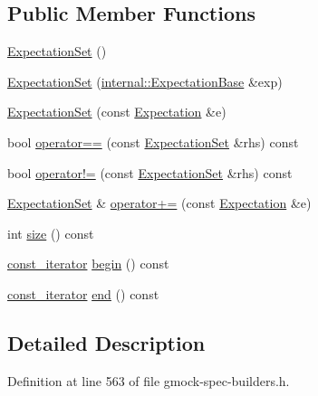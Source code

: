 \subsection*{Public Member Functions}
\begin{DoxyCompactItemize}
\item 
\hyperlink{classtesting_1_1_expectation_set_a78cda231077b84b5c94d25a845a74374}{Expectation\+Set} ()
\item 
\hyperlink{classtesting_1_1_expectation_set_a2448d9668e5b1a5372c97f59f1039db6}{Expectation\+Set} (\hyperlink{classtesting_1_1internal_1_1_expectation_base}{internal\+::\+Expectation\+Base} \&exp)
\item 
\hyperlink{classtesting_1_1_expectation_set_a2ab7f20951509d1358782093f3b7a25b}{Expectation\+Set} (const \hyperlink{classtesting_1_1_expectation}{Expectation} \&e)
\item 
bool \hyperlink{classtesting_1_1_expectation_set_a84f7bc8d35dc47d42d26fafca1086cfd}{operator==} (const \hyperlink{classtesting_1_1_expectation_set}{Expectation\+Set} \&rhs) const 
\item 
bool \hyperlink{classtesting_1_1_expectation_set_ab6379a0f99fcd3c19479ffcfb952b828}{operator!=} (const \hyperlink{classtesting_1_1_expectation_set}{Expectation\+Set} \&rhs) const 
\item 
\hyperlink{classtesting_1_1_expectation_set}{Expectation\+Set} \& \hyperlink{classtesting_1_1_expectation_set_a14d9f204ad4b55d56e257fc961caf756}{operator+=} (const \hyperlink{classtesting_1_1_expectation}{Expectation} \&e)
\item 
int \hyperlink{classtesting_1_1_expectation_set_a35216a46d989fbdb0827c8aab03afe87}{size} () const 
\item 
\hyperlink{classtesting_1_1_expectation_set_ab269a45f80d8c4f747b29de454a084bb}{const\+\_\+iterator} \hyperlink{classtesting_1_1_expectation_set_ae036e3a494d00edcc5cd90e23ed11dd1}{begin} () const 
\item 
\hyperlink{classtesting_1_1_expectation_set_ab269a45f80d8c4f747b29de454a084bb}{const\+\_\+iterator} \hyperlink{classtesting_1_1_expectation_set_a2b3fdd99a542b28cf8387e07fa32a152}{end} () const 
\end{DoxyCompactItemize}


\subsection{Detailed Description}


Definition at line 563 of file gmock-\/spec-\/builders.\+h.



